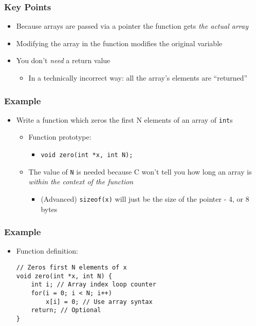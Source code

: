 \documentclass[14pt]{beamer}
\begin{document}
\begin{frame}
\frametitle{Key Points}
\begin{itemize}
\item Because arrays are passed via a pointer the function gets \textit{the actual array}
\item Modifying the array in the function modifies the original variable
\item You don't \textit{need} a return value
	\begin{itemize}
		\item In a technically incorrect way: all the array's elements are ``returned''
	\end{itemize}
\end{itemize}
\end{frame}

\begin{frame}
\frametitle{Example}
\begin{itemize}
\item Write a function which zeros the first N elements of an array of \texttt{int}s
\begin{itemize}
	\item Function prototype:
	\pause
		\begin{itemize}
			\item \texttt{void zero(int *x, int N);}
		\end{itemize}
	\pause
	\item The value of \texttt{N} is needed because C won't tell you how long an array is \textit{within the context of the function}
		\begin{itemize}
			\item (Advanced) \texttt{sizeof(x)} will just be the size of the pointer -  4, or 8 bytes
		\end{itemize}
	\end{itemize}
\end{itemize}
\end{frame}

\begin{frame}[fragile]
\frametitle{Example}
\begin{itemize}
\item Function definition:
\begin{lstlisting}[style=CStyle]
// Zeros first N elements of x
void zero(int *x, int N) {
	int i; // Array index loop counter
	for(i = 0; i < N; i++)
		x[i] = 0; // Use array syntax
	return; // Optional
}
\end{lstlisting}
\end{itemize}
\end{frame}
\end{document}
